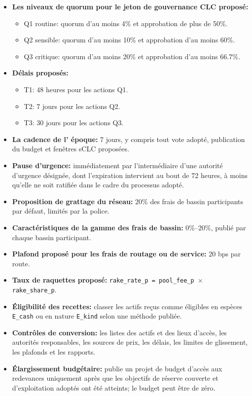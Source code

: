 \documentclass[11pt]{article}
\begin{document}
\begin{itemize}[leftmargin=*]
\item \textbf{Les niveaux de quorum pour le jeton de gouvernance CLC proposé:}
\begin{itemize}[leftmargin=*]
\item Q1 routine: quorum d'au moins 4\% et approbation de plus de 50\%.
\item Q2 sensible: quorum d'au moins 10\% et approbation d'au moins 60\%.
\item Q3 critique: quorum d'au moins 20\% et approbation d'au moins 66.7\%.
\end{itemize}
\item \textbf{Délais proposés:}
\begin{itemize}[leftmargin=*]
\item T1: 48 heures pour les actions Q1.
\item T2: 7 jours pour les actions Q2.
\item T3: 30 jours pour les actions Q3.
\end{itemize}
\item \textbf{La cadence de l' époque:} 7 jours, y compris tout vote adopté, publication du budget et fenêtres sCLC proposées.
\item \textbf{Pause d'urgence:} immédiatement par l'intermédiaire d'une autorité d'urgence désignée, dont l'expiration intervient au bout de 72 heures, à moins qu'elle ne soit ratifiée dans le cadre du processus adopté.
\item \textbf{Proposition de grattage du réseau:} 20\% des frais de bassin participants par défaut, limités par la police.
\item \textbf{Caractéristiques de la gamme des frais de bassin:} 0\%--20\%, publié par chaque bassin participant.
\item \textbf{Plafond proposé pour les frais de routage ou de service:} 20 bps par route.
\item \textbf{Taux de raquettes proposé:} \texttt{rake\_rate\_p = pool\_fee\_p $\times$ rake\_share\_p}.
\item \textbf{Éligibilité des recettes:} classer les actifs reçus comme éligibles en espèces \texttt{E\_cash} ou en nature \texttt{E\_kind} selon une méthode publiée.
\item \textbf{Contrôles de conversion:} les listes des actifs et des lieux d'accès, les autorités responsables, les sources de prix, les délais, les limites de glissement, les plafonds et les rapports.
\item \textbf{Élargissement budgétaire:} publie un projet de budget d'accès aux redevances uniquement après que les objectifs de réserve couverte et d'exploitation adoptés ont été atteints; le budget peut être de zéro.

\end{itemize}
\end{document}
